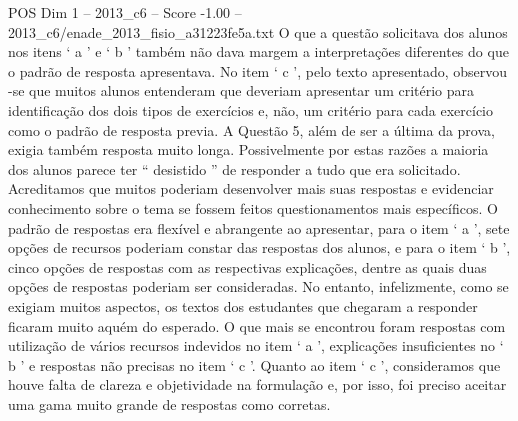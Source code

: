 \begin{textsample}{POS Dim 1 – 2013\_c6 – Score -1.00 – 2013\_c6/enade\_2013\_fisio\_a31223fe5a.txt}
O que a questão solicitava dos alunos nos itens ‘ a ’ e ‘ b ’ também não dava margem a interpretações diferentes do que o padrão de resposta apresentava.
No item ‘ c ’, pelo texto apresentado, observou -se que muitos alunos entenderam que deveriam apresentar um critério para identificação dos dois tipos de exercícios e, não, um critério para cada exercício como o padrão de resposta previa.
A Questão 5, além de ser a última da prova, exigia também resposta muito longa.
Possivelmente por estas razões a maioria dos alunos parece ter “ desistido ” de responder a tudo que era solicitado.
Acreditamos que muitos poderiam desenvolver mais suas respostas e evidenciar conhecimento sobre o tema se fossem feitos questionamentos mais específicos.
O padrão de respostas era flexível e abrangente ao apresentar, para o item ‘ a ’, sete opções de recursos poderiam constar das respostas dos alunos, e para o item ‘ b ’, cinco opções de respostas com as respectivas explicações, dentre as quais duas opções de respostas poderiam ser consideradas.
No entanto, infelizmente, como se exigiam muitos aspectos, os textos dos estudantes que chegaram a responder ficaram muito aquém do esperado.
O que mais se encontrou foram respostas com utilização de vários recursos indevidos no item ‘ a ’, explicações insuficientes no ‘ b ’ e respostas não precisas no item ‘ c ’.
Quanto ao item ‘ c ’, consideramos que houve falta de clareza e objetividade na formulação e, por isso, foi preciso aceitar uma gama muito grande de respostas como corretas.

\end{textsample}
